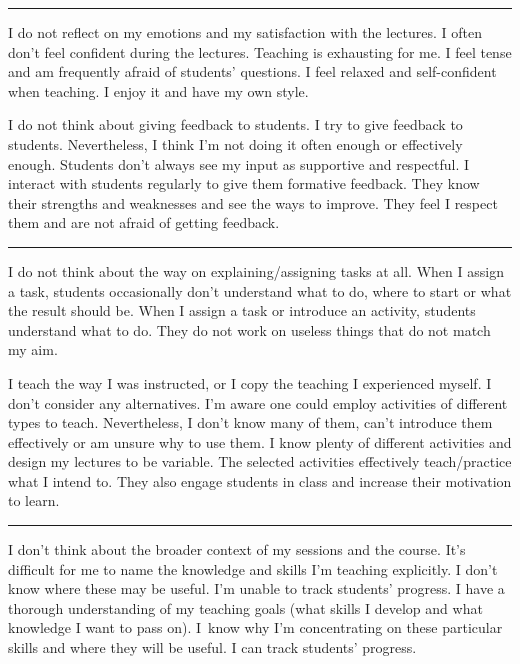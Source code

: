 \rule{\textwidth}{0.4pt}
{I do not reflect on my emotions and my satisfaction with the lectures.}
{I often don't feel confident during the lectures. Teaching is exhausting for me. I feel tense and am frequently afraid of students' questions.}
{I feel relaxed and self-confident when teaching. I enjoy it and have my own style.}

\newpage
{}
{I do not think about giving feedback to students.}
{I try to give feedback to students. Nevertheless, I think I'm not doing it often enough or effectively enough. Students don't always see my input as supportive and respectful.}
{I interact with students regularly to give them formative feedback. They know their strengths and weaknesses and see the ways to improve. They feel I respect them and are not afraid of getting feedback.}

\rule{\textwidth}{0.4pt}
{I do not think about the way on explaining/assigning tasks at all.}
{When I assign a task, students occasionally don't understand what to do, where to start or what the result should be.}
{When I assign a task or introduce an activity, students understand what to do. They do not work on useless things that do not match my aim.}

\newpage
{}
{I teach the way I was instructed, or I copy the teaching I experienced myself. I don't consider any alternatives.}
{I'm aware one could employ activities of different types to teach. Nevertheless, I don't know many of them, can't introduce them effectively or am unsure why to use them.}
{I know plenty of different activities and design my lectures to be variable. The selected activities effectively teach/practice what I intend to. They also engage students in class and increase their motivation to learn.}

\rule{\textwidth}{0.4pt}
{I don't think about the broader context of my sessions and the course.}
{It's difficult for me to name the knowledge and skills I'm teaching explicitly. I don't know where these may be useful. I'm unable to track students' progress.}
{I have a thorough understanding of my teaching goals (what skills I develop and what knowledge I want to pass on). I~know why I'm concentrating on these particular skills and where they will be useful. I can track students' progress.}
\vspace*{-1em}


